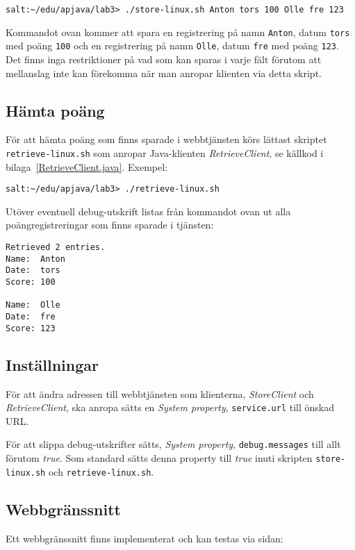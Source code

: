 \documentclass[a4paper, 12pt]{article}
\begin{document}
\begin{footnotesize}
\verb!salt:~/edu/apjava/lab3> ./store-linux.sh Anton tors 100 Olle fre 123!
\end{footnotesize}

Kommandot ovan kommer att spara en registrering på namn \verb!Anton!,
datum \verb!tors! med poäng \verb!100! och en registrering på namn
\verb!Olle!, datum \verb!fre! med poäng \verb!123!. Det finns inga
restriktioner på vad som kan sparas i varje fält förutom att
mellanslag inte kan förekomma när man anropar klienten via detta
skript.

\subsection{Hämta poäng}

För att hämta poäng som finns sparade i webbtjänsten körs lättast
skriptet \texttt{retrieve-linux.sh} som anropar Java-klienten
\textit{RetrieveClient}, se källkod i
bilaga~\ref{RetrieveClient.java}. Exempel:

\begin{footnotesize}
\verb!salt:~/edu/apjava/lab3> ./retrieve-linux.sh !
\end{footnotesize}

Utöver eventuell debug-utskrift listas från kommandot ovan ut alla
poängregistreringar som finns sparade i tjänsten:

\begin{footnotesize}
\begin{verbatim}
Retrieved 2 entries.
Name:  Anton
Date:  tors
Score: 100

Name:  Olle
Date:  fre
Score: 123
\end{verbatim}
\end{footnotesize}

\subsection{Inställningar}
För att ändra adressen till webbtjänsten som klienterna,
\textit{StoreClient} och \textit{RetrieveClient}, ska anropa sätts en
\textit{System property}, \verb!service.url! till önskad URL.

För att slippa debug-utskrifter sätts, \textit{System property}, 
\verb!debug.messages! till allt förutom \textit{true}. Som standard
sätts denna property till \textit{true} inuti skripten
\verb!store-linux.sh! och \verb!retrieve-linux.sh!.

\subsection{Webbgränssnitt}
Ett webbgränssnitt finns implementerat och kan testas via sidan:
\end{document}
